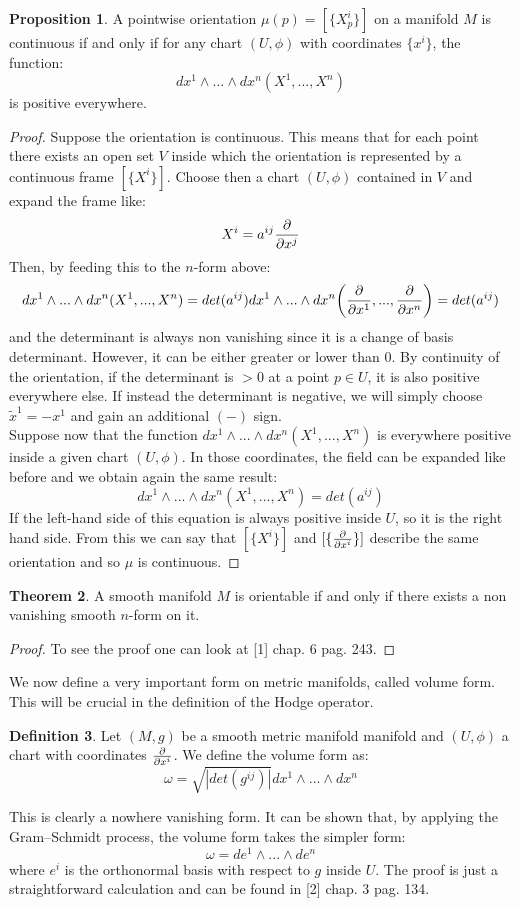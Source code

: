 \documentclass[12pt,a4paper]{report}
\theoremstyle{definition}
\newtheorem{Def}{Definition}[chapter]
\theoremstyle{Theorem}
\newtheorem{Theo}[Def]{Theorem}
\newtheorem{Prop}[Def]{Proposition}
\theoremstyle{definition}
\theoremstyle{definition}
\begin{document}
	\begin{Prop}
		A pointwise orientation $\mu(p)=[\{X^i_p\}]$ on a manifold $M$ is continuous if and only if for any chart $(U,\phi)$ with coordinates $\{x^i\}$, the function:
		$$dx^1\wedge...\wedge dx^n(X^1,...,X^n)$$
		is positive everywhere.
	\end{Prop}
	\begin{proof}
		Suppose the orientation is continuous. This means that for each point there exists an open set $V$ inside which the orientation is represented by a continuous frame $[\{X^i\}]$. Choose then a chart $(U,\phi)$ contained in $V$ and expand the frame like:
		$$X^i=a^{ij}{\partial\over \partial x^j}$$
		Then, by feeding this to the $n$-form above:
		$$dx^1\wedge...\wedge dx^n(X^1,...,X^n)=det(a^{ij})dx^1\wedge...\wedge dx^n\bigg({\partial\over \partial x^1},...,{\partial\over \partial x^n}\bigg)=det(a^{ij})$$
		and the determinant is always non vanishing since it is a change of basis determinant. However, it can be either greater or lower than 0. By continuity of the orientation, if the determinant is $>0$ at a point $p\in U$, it is also positive everywhere else. If instead the determinant is negative, we will simply choose $\tilde{x}^1=-x^1$ and gain an additional $(-)$ sign.\\
		Suppose now that the function $dx^1\wedge...\wedge dx^n(X^1,...,X^n)$ is everywhere positive inside a given chart $(U,\phi)$. In those coordinates, the field can be expanded like before and we obtain again the same result:
		$$dx^1\wedge...\wedge dx^n(X^1,...,X^n)=det(a^{ij})$$
		If the left-hand side of this equation is always positive inside $U$, so it is the right hand side. From this we can say that $[\{X^i\}]$ and $[\{{\partial\over\partial x^i}\}]$ describe the same orientation and so $\mu$ is continuous.
	\end{proof}
	\begin{Theo}
		A smooth manifold $M$ is orientable if and only if there exists a non vanishing smooth $n$-form on it.
	\end{Theo}
	\begin{proof}
		To see the proof one can look at [1] chap. 6 pag. 243.
	\end{proof}
	We now define a very important form on metric manifolds, called volume form. This will be crucial in the definition of the Hodge operator.
	\begin{Def}
		Let $(M,g)$ be a smooth metric manifold manifold and $(U,\phi)$ a chart with coordinates $\partial\over \partial x^i$. We define the volume form as:
		$$\omega=\sqrt{|det(g^{ij})|}dx^1\wedge...\wedge dx^n$$
	\end{Def}
	This is clearly a nowhere vanishing form. It can be shown that, by applying the Gram–Schmidt process, the volume form takes the simpler form:
	$$\omega=de^1\wedge...\wedge de^n$$
	where $e^i$ is the orthonormal basis with respect to $g$ inside $U$. The proof is just a straightforward calculation and can be found in [2] chap. 3 pag. 134.
\end{document}
